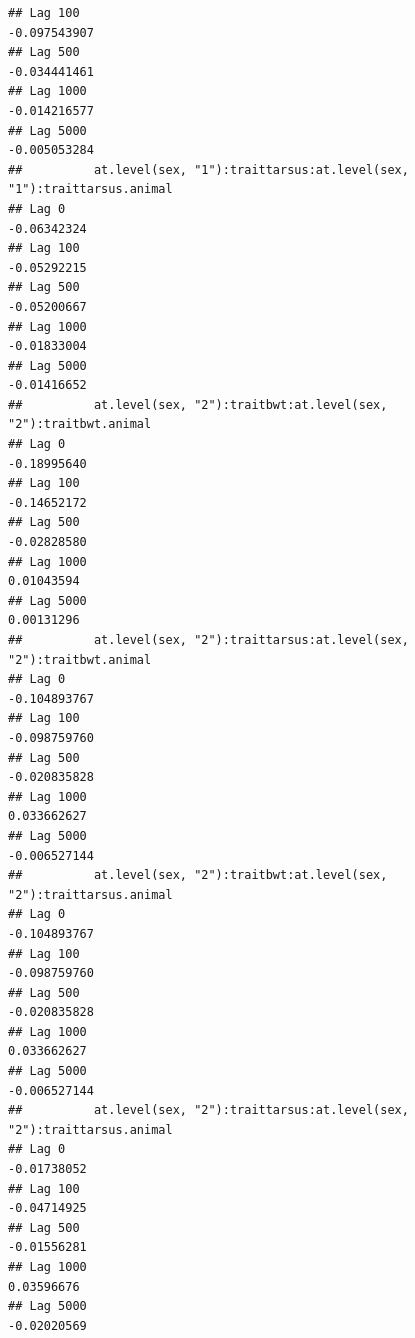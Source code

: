 \documentclass[
  12pt,
]{book}
\begin{document}
\begin{verbatim}
## Lag 100                                                       -0.097543907
## Lag 500                                                       -0.034441461
## Lag 1000                                                      -0.014216577
## Lag 5000                                                      -0.005053284
##          at.level(sex, "1"):traittarsus:at.level(sex, "1"):traittarsus.animal
## Lag 0                                                             -0.06342324
## Lag 100                                                           -0.05292215
## Lag 500                                                           -0.05200667
## Lag 1000                                                          -0.01833004
## Lag 5000                                                          -0.01416652
##          at.level(sex, "2"):traitbwt:at.level(sex, "2"):traitbwt.animal
## Lag 0                                                       -0.18995640
## Lag 100                                                     -0.14652172
## Lag 500                                                     -0.02828580
## Lag 1000                                                     0.01043594
## Lag 5000                                                     0.00131296
##          at.level(sex, "2"):traittarsus:at.level(sex, "2"):traitbwt.animal
## Lag 0                                                         -0.104893767
## Lag 100                                                       -0.098759760
## Lag 500                                                       -0.020835828
## Lag 1000                                                       0.033662627
## Lag 5000                                                      -0.006527144
##          at.level(sex, "2"):traitbwt:at.level(sex, "2"):traittarsus.animal
## Lag 0                                                         -0.104893767
## Lag 100                                                       -0.098759760
## Lag 500                                                       -0.020835828
## Lag 1000                                                       0.033662627
## Lag 5000                                                      -0.006527144
##          at.level(sex, "2"):traittarsus:at.level(sex, "2"):traittarsus.animal
## Lag 0                                                             -0.01738052
## Lag 100                                                           -0.04714925
## Lag 500                                                           -0.01556281
## Lag 1000                                                           0.03596676
## Lag 5000                                                          -0.02020569

\end{verbatim}
\end{document}
